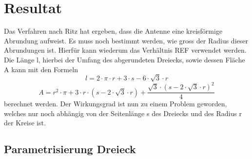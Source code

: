 %
%
% 
%
%

\section{Resultat\label{antennen:resultat}}

Das Verfahren nach Ritz hat ergeben, dass die Antenne eine kreisförmige Abrundung aufweist. Es muss noch bestimmt werden, wie gross der Radius dieser Abrundungen ist. Hierfür kann wiederum das Verhältnis REF verwendet werden. Die Länge l, hierbei der Umfang des abgerundeten Dreiecks, sowie dessen Fläche A kann mit den Formeln
\begin{equation}
	l=2\cdot{\pi}\cdot{r}+3\cdot{s}-6\cdot{\sqrt{3}}\cdot{r}
	\label{antennen:Länge}
\end{equation}
\begin{equation}
	A=r^2\cdot{\pi}+3\cdot{r}\cdot{(s-2\cdot{\sqrt{3}}\cdot{r})}+\frac{\sqrt{3}\cdot{(s-2\cdot{\sqrt{3}}\cdot{r})^2}}{4}
	\label{antennen:Fläche}
\end{equation}
berechnet werden.
Der Wirkungsgrad ist nun zu einem Problem geworden, welches nur noch abhängig von der Seitenlänge s des Dreiecks und des Radius r der Kreise ist.

\subsection{Parametrisierung Dreieck\label{antennen:param3eck}}

